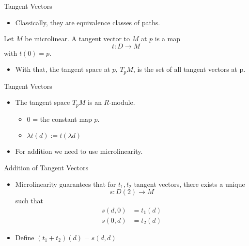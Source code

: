 \documentclass{beamer}
\begin{document}
\begin{frame}{Tangent Vectors}

  \begin{itemize}
    \item Classically, they are equivalence classes of paths.
  \end{itemize}
  \pause
  \begin{defn}
    Let \( M \) be microlinear. A \alert{tangent vector} to \( M \) at \( p \) is a map
    \begin{equation*}
      t:D\to M
    \end{equation*}
    with \( t(0)=p \).
  \end{defn}
  \pause
  \begin{itemize}
    \item With that, the \alert{tangent space} at \( p \), \( T_pM \), is the set of all
      tangent vectors at p.
  \end{itemize}

\end{frame}

\begin{frame}{Tangent Vectors}
  \begin{itemize}
    \item The tangent space \( T_pM \) is an \( R \)-module.
      \begin{itemize}
        \item \( 0 \) = the constant map \( p \).
        \item \( \lambda t(d) := t(\lambda d)\)
      \end{itemize}
    \item For addition we need to use microlinearity.
  \end{itemize}
\end{frame}

\begin{frame}{Addition of Tangent Vectors}
  \begin{itemize}
    \item Microlinearity guarantees that for \( t_1, t_2 \) tangent vectors,
      there exists a unique
      \begin{equation*}
        s:D(2)\to M
      \end{equation*}
      such that
      \begin{align*}
        s(d,0) &= t_1(d)\\
        s(0,d) &= t_2(d)
      \end{align*}
    \item Define \( (t_1 + t_2)(d) = s(d,d) \)
  \end{itemize}
\end{frame}
\end{document}
